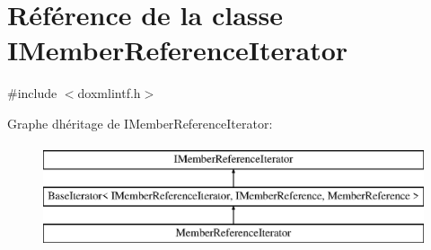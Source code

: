 \hypertarget{class_i_member_reference_iterator}{}\section{Référence de la classe I\+Member\+Reference\+Iterator}
\label{class_i_member_reference_iterator}


{\ttfamily \#include $<$doxmlintf.\+h$>$}

Graphe d\textquotesingle{}héritage de I\+Member\+Reference\+Iterator\+:\begin{figure}[H]
\begin{center}
\leavevmode
\includegraphics[height=3.000000cm]{class_i_member_reference_iterator}
\end{center}
\end{figure}

